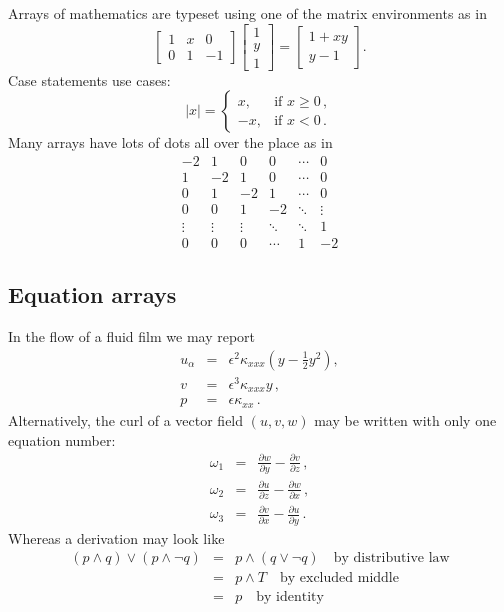 \documentclass[9pt]{memoir}
\begin{document}
Arrays of mathematics are typeset using one of the matrix environments as 
in
\[
	\begin{bmatrix}
		1 & x & 0 \\
		0 & 1 & -1
	\end{bmatrix}\begin{bmatrix}
		1  \\
		y  \\
		1
	\end{bmatrix}
	=\begin{bmatrix}
		1+xy  \\
		y-1
	\end{bmatrix}.
\]
Case statements use cases:
\[
	|x|=\begin{cases}
		x, & \text{if }x\geq 0\,,  \\
		-x, & \text{if }x< 0\,.
	\end{cases}
\]
Many arrays have lots of dots all over the place as in
\[
	\begin{matrix}
		-2 & 1 & 0 & 0 & \cdots & 0  \\
		1 & -2 & 1 & 0 & \cdots & 0  \\
		0 & 1 & -2 & 1 & \cdots & 0  \\
		0 & 0 & 1 & -2 & \ddots & \vdots \\
		\vdots & \vdots & \vdots & \ddots & \ddots & 1  \\
		0 & 0 & 0 & \cdots & 1 & -2
	\end{matrix}
\]

\subsection{Equation arrays}

In the flow of a fluid film we may report
\begin{eqnarray}
	u_\alpha & = & \epsilon^2 \kappa_{xxx} 
	\left( y-\frac{1}{2}y^2 \right),
	\label{equ}  \\
	v & = & \epsilon^3 \kappa_{xxx} y\,,
	\label{eqv}  \\
	p & = & \epsilon \kappa_{xx}\,.
	\label{eqp}
\end{eqnarray}
Alternatively, the curl of a vector field $(u,v,w)$ may be written 
with only one equation number:
\begin{eqnarray}
	\omega_1 & = &
	\frac{\partial w}{\partial y}-\frac{\partial v}{\partial z}\,,
	\nonumber  \\
	\omega_2 & = & 
	\frac{\partial u}{\partial z}-\frac{\partial w}{\partial x}\,,
	\label{eqcurl}  \\
	\omega_3 & = & 
	\frac{\partial v}{\partial x}-\frac{\partial u}{\partial y}\,.
	\nonumber
\end{eqnarray}
Whereas a derivation may look like
\begin{eqnarray*}
	(p\wedge q)\vee(p\wedge\neg q) & = & p\wedge(q\vee\neg q)
	\quad\text{by distributive law}  \\
	 & = & p\wedge T \quad\text{by excluded middle}  \\
	 & = & p \quad\text{by identity}
\end{eqnarray*}
\end{document}
